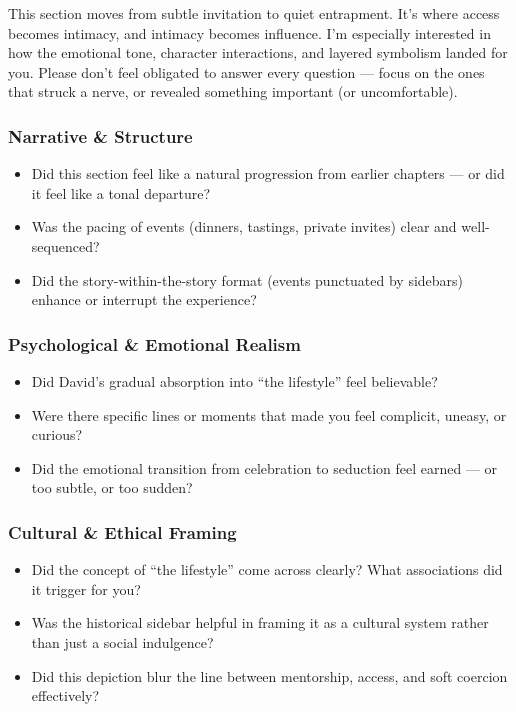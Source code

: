 This section moves from subtle invitation to quiet entrapment. It’s where access becomes intimacy, and intimacy becomes influence. I’m especially interested in how the emotional tone, character interactions, and layered symbolism landed for you. Please don’t feel obligated to answer every question — focus on the ones that struck a nerve, or revealed something important (or uncomfortable).

\subsubsection{Narrative \& Structure}

\begin{itemize}
  \item Did this section feel like a natural progression from earlier chapters — or did it feel like a tonal departure?
  \item Was the pacing of events (dinners, tastings, private invites) clear and well-sequenced?
  \item Did the story-within-the-story format (events punctuated by sidebars) enhance or interrupt the experience?
\end{itemize}

\subsubsection{Psychological \& Emotional Realism}

\begin{itemize}
  \item Did David’s gradual absorption into “the lifestyle” feel believable?
  \item Were there specific lines or moments that made you feel complicit, uneasy, or curious?
  \item Did the emotional transition from celebration to seduction feel earned — or too subtle, or too sudden?
\end{itemize}

\subsubsection{Cultural \& Ethical Framing}

\begin{itemize}
  \item Did the concept of “the lifestyle” come across clearly? What associations did it trigger for you?
  \item Was the historical sidebar helpful in framing it as a cultural system rather than just a social indulgence?
  \item Did this depiction blur the line between mentorship, access, and soft coercion effectively?
\end{itemize}

